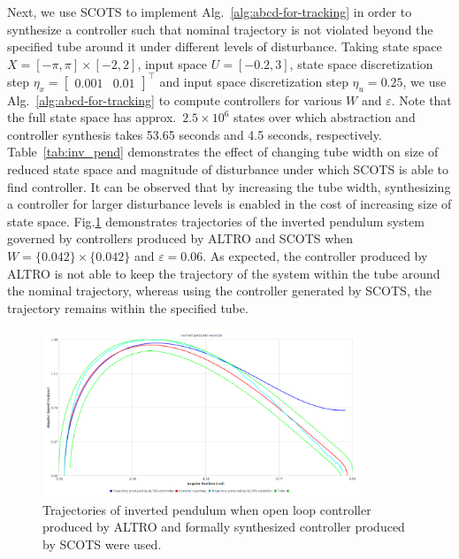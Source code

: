 Next, we use SCOTS to implement Alg.~\ref{alg:abcd-for-tracking} in order to synthesize a controller such that nominal trajectory is not violated beyond the specified tube around it under different levels of disturbance. Taking state space $X=[-\pi,\pi]\times[-2,2]$, input space $U=[-0.2,3]$, state space discretization step $\eta_x=\begin{bmatrix}0.001&0.01\end{bmatrix}^\top$ and input space discretization step $\eta_u=0.25$, we use Alg.~\ref{alg:abcd-for-tracking} to compute controllers for various $W$ and $\varepsilon$. Note that the full state space has approx.\ $2.5\times 10^6$ states over which abstraction and controller synthesis takes 53.65 seconds and 4.5 seconds, respectively. Table~\ref{tab:inv_pend} demonstrates the effect of changing tube width on size of reduced state space and magnitude of disturbance under which SCOTS is able to find controller. It can be observed that by increasing the tube width, synthesizing a controller for larger disturbance levels is enabled in the cost of increasing size of state space. Fig.\ref{fig:invpend_traj} demonstrates trajectories of the inverted pendulum system governed by controllers produced by ALTRO and SCOTS when $W=\{0.042\}\times \{0.042\}$ and $\varepsilon=0.06$. As expected, the controller produced by ALTRO is not able to keep the trajectory of the system within the tube around the nominal trajectory, whereas using the controller generated by SCOTS, the trajectory remains within the specified tube.
\begin{figure}[t]\label{fig:invpend_traj}
	\centering
	\includegraphics[width=0.85\textwidth]{traj_inv_pend.png}
	\caption{Trajectories of inverted pendulum when open loop controller produced by ALTRO and formally synthesized controller produced by SCOTS were used.}
\end{figure}
